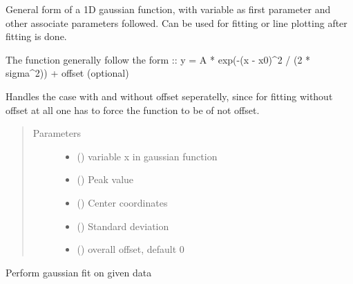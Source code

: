 \documentclass[letterpaper,10pt,english]{sphinxmanual}
\begin{document}
\begin{fulllineitems}
\begin{fulllineitems}
General form of a 1D gaussian function, with variable as first
parameter and other associate parameters followed. Can be used
for fitting or line plotting after fitting is done.

The function generally follow the form ::
y = A * exp(-(x - x0)\textasciicircum{}2 / (2 * sigma\textasciicircum{}2)) + offset (optional)

Handles the case with and without offset seperatelly, since for
fitting without offset at all one has to force the function to
be of not offset.
\begin{quote}\begin{description}
\item[{Parameters}] \leavevmode\begin{itemize}
\item {} 
 () \textendash{} variable x in gaussian function

\item {} 
 () \textendash{} Peak value

\item {} 
 () \textendash{} Center coordinates

\item {} 
 () \textendash{} Standard deviation

\item {} 
 () \textendash{} overall offset, default 0

\end{itemize}

\end{description}\end{quote}

\end{fulllineitems}


\begin{fulllineitems}
\label{\detokenize{scibeam.core:scibeam.core.gaussian.Gaussian.gausFit}}
Perform gaussian fit on given data


\end{fulllineitems}
\end{fulllineitems}
\end{document}
